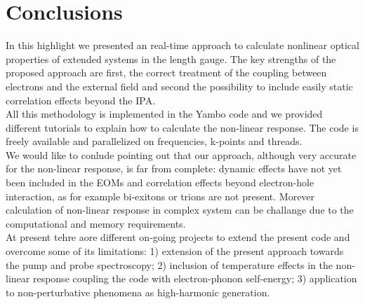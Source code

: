 \section{Conclusions}\label{conclusion}                                        
In this highlight we presented an \ai real-time approach to calculate nonlinear optical properties of extended systems in the length gauge. The key strengths of the proposed approach are first, the correct treatment of the coupling between electrons and the external field and second the possibility to include easily static correlation effects beyond the IPA.\\ 
All this methodology is implemented in the Yambo code\cite{yambo} and we provided different tutorials to explain how to calculate the non-linear response.\cite{yambo_wiki} The code is freely available and parallelized on frequencies, k-points and threads. \\
We would like to conlude pointing out that our approach, although very accurate for the non-linear response, is far from complete: dynamic effects have not yet been included in the EOMs and correlation effects beyond electron-hole interaction, as for example bi-exitons or trions are not present.\cite{schafer} Morever calculation of non-linear response in complex system can be challange due to the computational and memory requirements.\\
At present tehre aore different on-going projects to extend the present code and overcome some of its limitations: 1) extension of the present approach towards the pump and probe spectroscopy; 2) inclusion of temperature effects in the non-linear response coupling the code with electron-phonon self-energy; 3) application to non-perturbative phenomena as high-harmonic generation.



